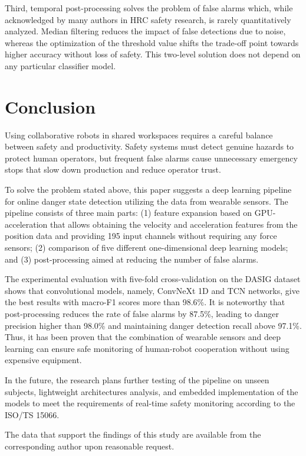 \documentclass[pdflatex,sn-mathphys-num]{sn-jnl}%
\begin{document}
Third, temporal post-processing solves the problem of false alarms which, while acknowledged by many authors in HRC safety research, is rarely quantitatively analyzed. Median filtering reduces the impact of false detections due to noise, whereas the optimization of the threshold value shifts the trade-off point towards higher accuracy without loss of safety. This two-level solution does not depend on any particular classifier model.

\section{Conclusion}\label{sec:conclusion}

Using collaborative robots in shared workspaces requires a careful balance between safety and productivity. Safety systems must detect genuine hazards to protect human operators, but frequent false alarms cause unnecessary emergency stops that slow down production and reduce operator trust.

To solve the problem stated above, this paper suggests a deep learning pipeline for online danger state detection utilizing the data from wearable sensors. The pipeline consists of three main parts: (1) feature expansion based on GPU-acceleration that allows obtaining the velocity and acceleration features from the position data and providing 195 input channels without requiring any force sensors; (2) comparison of five different one-dimensional deep learning models; and (3) post-processing aimed at reducing the number of false alarms.

The experimental evaluation with five-fold cross-validation on the DASIG dataset shows that convolutional models, namely, ConvNeXt 1D and TCN networks, give the best results with macro-F1 scores more than 98.6\%. It is noteworthy that post-processing reduces the rate of false alarms by 87.5\%, leading to danger precision higher than 98.0\% and maintaining danger detection recall above 97.1\%. Thus, it has been proven that the combination of wearable sensors and deep learning can ensure safe monitoring of human-robot cooperation without using expensive equipment.

In the future, the research plans further testing of the pipeline on unseen subjects, lightweight architectures analysis, and embedded implementation of the models to meet the requirements of real-time safety monitoring according to the ISO/TS 15066.

\backmatter
{}

The data that support the findings of this study are available from the corresponding author upon reasonable request.

\newpage
\end{document}
